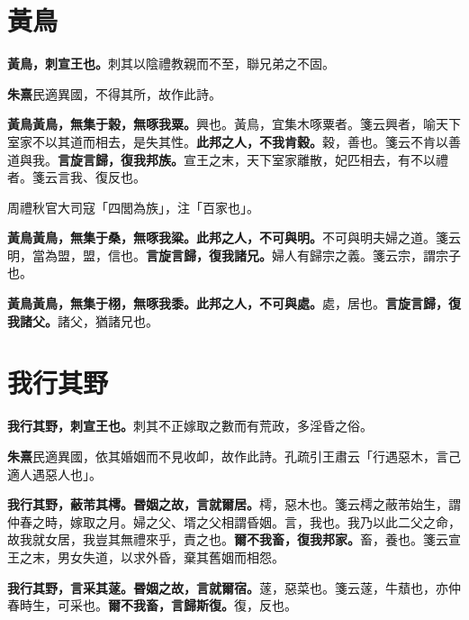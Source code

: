 \section{黃鳥}


\textbf{黃鳥，刺宣王也。}{\footnotesize 刺其以陰禮教親而不至，聯兄弟之不固。}

\begin{quoting}\textbf{朱熹}民適異國，不得其所，故作此詩。\end{quoting}

\textbf{黃鳥黃鳥，無集于榖，無啄我粟。}{\footnotesize 興也。黃鳥，宜集木啄粟者。箋云興者，喻天下室家不以其道而相去，是失其性。}\textbf{此邦之人，不我肯穀。}{\footnotesize 穀，善也。箋云不肯以善道與我。}\textbf{言旋言歸，復我邦族。}{\footnotesize 宣王之末，天下室家離散，妃匹相去，有不以禮者。箋云言我、復反也。}

\begin{quoting}周禮秋官大司寇「四閭為族」，注「百家也」。\end{quoting}

\textbf{黃鳥黃鳥，無集于桑，無啄我粱。此邦之人，不可與明。}{\footnotesize 不可與明夫婦之道。箋云明，當為盟，盟，信也。}\textbf{言旋言歸，復我諸兄。}{\footnotesize 婦人有歸宗之義。箋云宗，謂宗子也。}

\textbf{黃鳥黃鳥，無集于栩，無啄我黍。此邦之人，不可與處。}{\footnotesize 處，居也。}\textbf{言旋言歸，復我諸父。}{\footnotesize 諸父，猶諸兄也。}

\section{我行其野}


\textbf{我行其野，刺宣王也。}{\footnotesize 刺其不正嫁取之數而有荒政，多淫昏之俗。}

\begin{quoting}\textbf{朱熹}民適異國，依其婚姻而不見收卹，故作此詩。孔疏引王肅云「行遇惡木，言己適人遇惡人也」。\end{quoting}

\textbf{我行其野，蔽芾其樗。昬姻之故，言就爾居。}{\footnotesize 樗，惡木也。箋云樗之蔽芾始生，謂仲春之時，嫁取之月。婦之父、壻之父相謂昏姻。言，我也。我乃以此二父之命，故我就女居，我豈其無禮來乎，責之也。}\textbf{爾不我畜，復我邦家。}{\footnotesize 畜，養也。箋云宣王之末，男女失道，以求外昏，棄其舊姻而相怨。}

\textbf{我行其野，言采其蓫。昬姻之故，言就爾宿。}{\footnotesize 蓫，惡菜也。箋云蓫，牛蘈也，亦仲春時生，可采也。}\textbf{爾不我畜，言歸斯復。}{\footnotesize 復，反也。}

